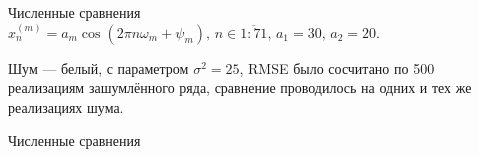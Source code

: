 \documentclass[ucs, notheorems, handout]{beamer}
\begin{document}
    \begin{frame}{Численные сравнения}
        $x_n^{(m)} = a_m \cos(2\pi n \omega_m + \psi_m),\, n\in\overline{1:71},\, a_1 = 30,\, a_2 = 20$.

        \vspace{0.3cm}

        Шум --- белый, с параметром $\sigma^2=25$, RMSE было сосчитано по 500 реализациям зашумлённого ряда,
        сравнение проводилось на одних и тех же реализациях шума.
    \end{frame}

    \begin{frame}{Численные сравнения}
        \begin{table}[!ht]
            \centering
            \caption{RMSE восстановленных различными методами сигналов для каждого набора параметров сигнала.}
            \def\arraystretch{1.7}
\end{table}
\end{frame}
\end{document}
